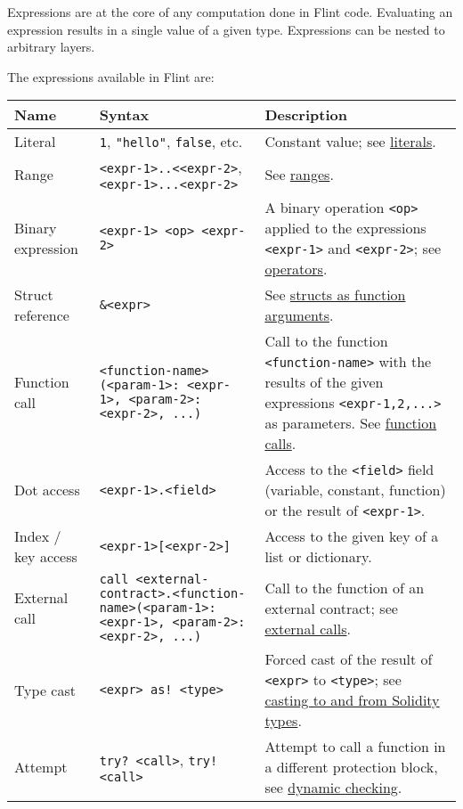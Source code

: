 Expressions are at the core of any computation done in Flint code. Evaluating an expression results in a single value of a given type. Expressions can be nested to arbitrary layers.

The expressions available in Flint are:

\begin{center}
\begin{tabularx}{\textwidth}{llX}
	Name & Syntax & Description\\\hline
	Literal & \texttt{1}, \texttt{"hello"}, \texttt{false}, etc. & Constant value; see \hyperref[sec:appendix-b-literals]{literals}.\\
	Range & \texttt{<expr-1>..<<expr-2>}, \texttt{<expr-1>...<expr-2>} & See \hyperref[sec:appendix-b-range-types]{ranges}.\\
	Binary expression & \texttt{<expr-1> <op> <expr-2>} & A binary operation \texttt{<op>} applied to the expressions \texttt{<expr-1>} and \texttt{<expr-2>}; see \hyperref[sec:appendix-b-operators]{operators}.\\
	Struct reference & \texttt{\&<expr>} & See \hyperref[sec:appendix-b-structs-as-function-arguments]{structs as function arguments}.\\
	Function call & \texttt{<function-name>(<param-1>: <expr-1>, <param-2>: <expr-2>, ...)} & Call to the function \texttt{<function-name>} with the results of the given expressions \texttt{<expr-1,2,...>} as parameters. See \hyperref[sec:appendix-b-function-calls]{function calls}.\\
	Dot access & \texttt{<expr-1>.<field>} & Access to the \texttt{<field>} field (variable, constant, function) or the result of \texttt{<expr-1>}.\\
	Index / key access & \texttt{<expr-1>[<expr-2>]} & Access to the given key of a list or dictionary.\\
	External call & \texttt{call <external-contract>.<function-name>(<param-1>: <expr-1>, <param-2>: <expr-2>, ...)} & Call to the function of an external contract; see \hyperref[sec:appendix-b-external-calls]{external calls}.\\
	Type cast & \texttt{<expr> as! <type>} & Forced cast of the result of \texttt{<expr>} to \texttt{<type>}; see \hyperref[sec:appendix-b-casting-to-and-from-solidity-types]{casting to and from Solidity types}.\\
	Attempt & \texttt{try? <call>}, \texttt{try! <call>} & Attempt to call a function in a different protection block, see \hyperref[sec:appendix-b-dynamic-checking]{dynamic checking}.
\end{tabularx}
\end{center}

